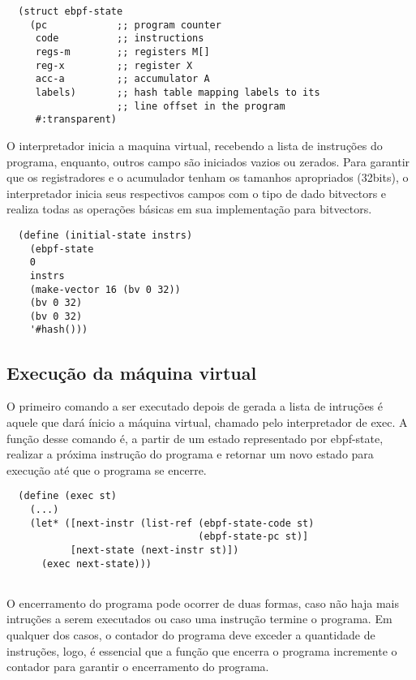 \documentclass[paper=a4, fontsize=12pt]{article}
\theoremstyle{definition}
\begin{document}
\begin{lstlisting}
  (struct ebpf-state
    (pc            ;; program counter
     code          ;; instructions
     regs-m        ;; registers M[]
     reg-x         ;; register X
     acc-a         ;; accumulator A
     labels)       ;; hash table mapping labels to its
                   ;; line offset in the program
     #:transparent)
\end{lstlisting}

O interpretador inicia a maquina virtual, recebendo a lista de instruções do programa,
enquanto, outros campo são iniciados vazios ou zerados.
Para garantir que os registradores e o acumulador tenham os tamanhos apropriados (32bits),
o interpretador inicia seus respectivos campos com o tipo de dado bitvectors e realiza
todas as operações básicas em sua implementação para bitvectors.  

\begin{lstlisting}
  (define (initial-state instrs)
    (ebpf-state
    0
    instrs
    (make-vector 16 (bv 0 32))
    (bv 0 32)
    (bv 0 32)
    '#hash()))
\end{lstlisting}

\subsection{Execução da máquina virtual}
O primeiro comando a ser executado depois de gerada a lista de intruções é aquele que dará
ínicio a máquina virtual, chamado pelo interpretador de exec. A função desse comando é, a partir de
um estado representado por ebpf-state, realizar a próxima instrução do programa e retornar um novo
estado para execução até que o programa se encerre. 

\begin{lstlisting}
  (define (exec st)
    (...)
    (let* ([next-instr (list-ref (ebpf-state-code st)
                                 (ebpf-state-pc st)]
           [next-state (next-instr st)])
      (exec next-state)))  
           
\end{lstlisting}

O encerramento do programa pode ocorrer de duas formas, caso não haja mais intruções a 
serem executados ou caso uma instrução termine o programa. Em qualquer dos casos, o contador do 
programa deve exceder a quantidade de instruções, logo, é essencial que a função que encerra o
programa incremente o contador para garantir o encerramento do programa.
\end{document}
